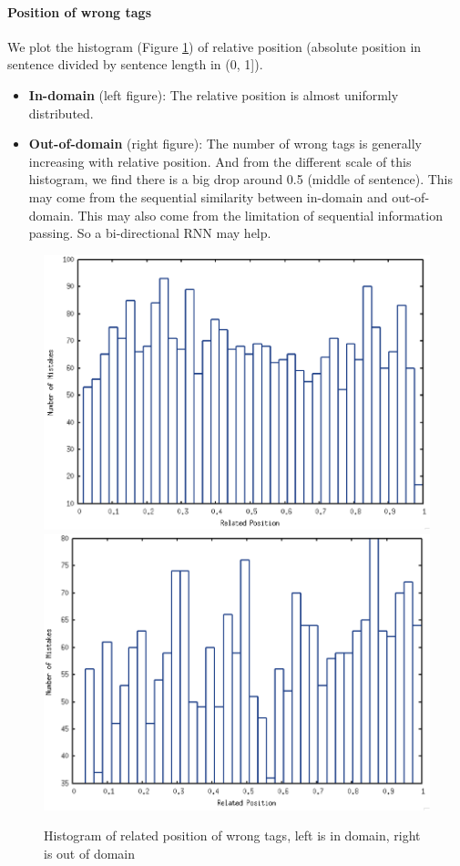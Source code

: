 \documentclass[11pt]{article}
\begin{document}
\paragraph{Position of wrong tags } 
We plot the histogram (Figure \ref{Pos_fig}) of relative position (absolute position in sentence divided by sentence length in (0, 1]). 
\begin{itemize}
\item \textbf{In-domain} (left figure): The relative position is almost uniformly distributed.
\item \textbf{Out-of-domain} (right figure): The number of wrong tags is generally increasing with relative position. And from the different scale of this histogram, we find there is a big drop around 0.5 (middle of sentence). This may come from the sequential similarity between in-domain and out-of-domain. This may also come from the limitation of sequential information passing. So a bi-directional RNN may help.
\end{itemize}
\begin{figure}
\includegraphics[scale=0.25]{indomain_pos.png} 
\includegraphics[scale=0.25]{outdomain_pos.png} 
\caption{Histogram of related position of wrong tags, left is in domain, right is out of domain}\label{Pos_fig}
\end{figure}
\end{document}
